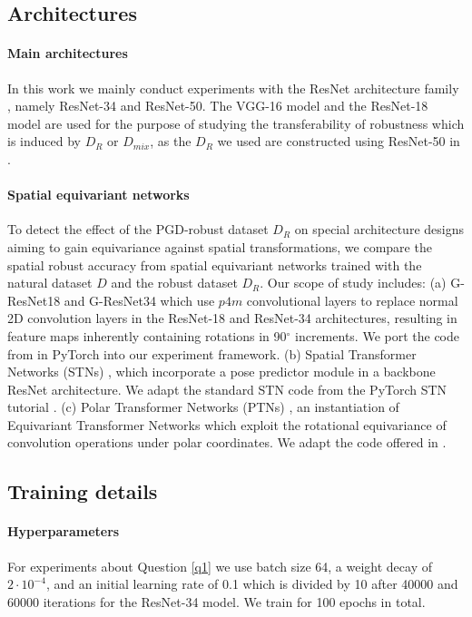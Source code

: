 \subsection{Architectures}

\paragraph{Main architectures} In this work we mainly conduct experiments with the ResNet architecture family \cite{He16}, namely ResNet-34 and ResNet-50. The VGG-16 \cite{Simonyan15} model and the ResNet-18 model are used for the purpose of studying the transferability of robustness which is induced by $D_R$ or $D_{mix}$, as the $D_R$ we used are constructed using ResNet-50 in \cite{Ilyas2019}. 

\paragraph{Spatial equivariant networks} To detect the effect of the PGD-robust dataset $D_R$ on special architecture designs aiming to gain equivariance against spatial transformations, we  compare the spatial robust accuracy from spatial equivariant networks trained with the natural dataset $D$ and the robust dataset $D_R$. Our scope of study includes: (a) G-ResNet18 and G-ResNet34 \cite{Cohen16} which use $p4m$ convolutional layers to replace normal 2D convolution layers in the ResNet-18 and ResNet-34 architectures, resulting in feature maps inherently containing rotations in 90$^\circ$ increments. We port the code from \cite{Bielski} in PyTorch into our experiment framework. (b) Spatial Transformer Networks (STNs) \cite{Jaderberg15}, which incorporate a pose predictor module in a backbone ResNet architecture. We adapt the standard STN code from the PyTorch STN tutorial \cite{pytorchstn}. (c) Polar Transformer Networks (PTNs) \cite{Esteves18}, an instantiation of Equivariant Transformer Networks \cite{Tai19} which exploit the rotational equivariance of convolution operations under polar coordinates. We adapt the code offered in \cite{Tai19}.

\subsection{Training details}

\paragraph{Hyperparameters} For experiments about Question \ref{q1} we use batch size 64, a weight decay of $2 \cdot 10^{-4}$, and an initial learning rate of 0.1 which is divided by 10 after 40000 and 60000 iterations for the ResNet-34 model. We train for 100 epochs in total. 

